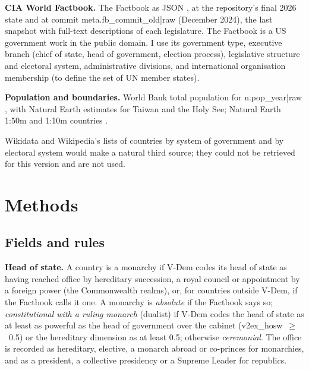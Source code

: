 \documentclass[11pt,a4paper]{article}
\begin{document}
\textbf{CIA World Factbook.} The Factbook as JSON \citep{factbook}, at the repository's final 2026 state and at commit {{meta.fb_commit_old|raw}} (December 2024), the last snapshot with full-text descriptions of each legislature. The Factbook is a US government work in the public domain. I use its government type, executive branch (chief of state, head of government, election process), legislative structure and electoral system, administrative divisions, and international organisation membership (to define the set of UN member states).

\textbf{Population and boundaries.} World Bank total population for {{n.pop_year|raw}} \citep{wb}, with Natural Earth estimates for Taiwan and the Holy See; Natural Earth 1:50m and 1:10m countries \citep{naturalearth}.

Wikidata and Wikipedia's lists of countries by system of government and by electoral system would make a natural third source; they could not be retrieved for this version and are not used.

\section{Methods}
\subsection{Fields and rules}
\textbf{Head of state.} A country is a monarchy if V-Dem codes its head of state as having reached office by hereditary succession, a royal council or appointment by a foreign power (the Commonwealth realms), or, for countries outside V-Dem, if the Factbook calls it one. A monarchy is \emph{absolute} if the Factbook says so; \emph{constitutional with a ruling monarch} (dualist) if V-Dem codes the head of state as at least as powerful as the head of government over the cabinet (v2ex\_hosw~$\geq$~0.5) or the hereditary dimension as at least 0.5; otherwise \emph{ceremonial}. The office is recorded as hereditary, elective, a monarch abroad or co-princes for monarchies, and as a president, a collective presidency or a Supreme Leader for republics.
\end{document}
